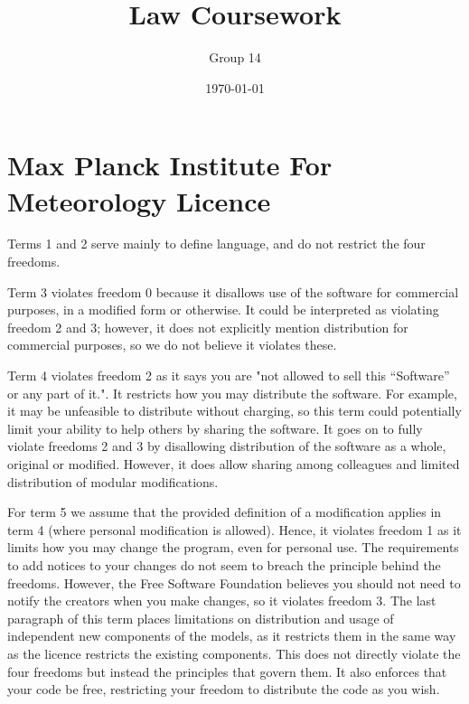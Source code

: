 \documentclass[a4wide, 11pt]{article}
\begin{document}
\title{\vspace{-1cm}Law Coursework}

\author{\vspace{-1cm}Group 14}

\date{\today}         %

\maketitle            %

\renewcommand\thesection{\arabic{section}}
\renewcommand\thesubsection{\thesection.\alph{subsection}}

\section{Max Planck Institute For Meteorology Licence}

Terms 1 and 2 serve mainly to define language, and do not restrict the four freedoms.

Term 3 violates freedom 0 because it disallows use of the software for commercial purposes, in a modified form or otherwise. It could be interpreted as violating freedom 2 and 3; however, it does not explicitly mention distribution for commercial purposes, so we do not believe it violates these.

Term 4 violates freedom 2 as it says you are "not allowed to sell this “Software” or any part of it.". It restricts how you may distribute the software. For example, it may be unfeasible to distribute without charging, so this term could potentially limit your ability to help others by sharing the software. It goes on to fully violate freedoms 2 and 3 by disallowing distribution of the software as a whole, original or modified. However, it does allow sharing among colleagues and limited distribution of modular modifications.

For term 5 we assume that the provided definition of a modification applies in term 4 (where personal modification is allowed). Hence, it violates freedom 1 as it limits how you may change the program, even for personal use. The requirements to add notices to your changes do not seem to breach the principle behind the freedoms. However, the Free Software Foundation believes you should not need to notify the creators when you make changes, so it violates freedom 3. The last paragraph of this term places limitations on distribution and usage of independent new components of the models, as it restricts them in the same way as the licence restricts the existing components. This does not directly violate the four freedoms but instead the principles that govern them. It also enforces that your code be free, restricting your freedom to distribute the code as you wish.
\end{document}
